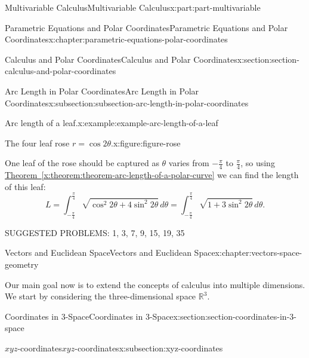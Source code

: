 \documentclass[twoside,10pt,]{book}
\newcommand{\xreffont}{\relax}
\numberwithin{equation}{part}
\newcommand{\RR}{\mathbb{R}}
\begin{document}
\begin{partptx}{Multivariable Calculus}{}{Multivariable Calculus}{}{}{x:part:part-multivariable}
\begin{chapterptx}{Parametric Equations and Polar Coordinates}{}{Parametric Equations and Polar Coordinates}{}{}{x:chapter:parametric-equations-polar-coordinates}
\begin{sectionptx}{Calculus and Polar Coordinates}{}{Calculus and Polar Coordinates}{}{}{x:section:section-calculus-and-polar-coordinates}
\begin{subsectionptx}{Arc Length in Polar Coordinates}{}{Arc Length in Polar Coordinates}{}{}{x:subsection:subsection-arc-length-in-polar-coordinates}
\begin{example}{Arc length of a leaf.}{x:example:example-arc-length-of-a-leaf}
\begin{figureptx}{The four leaf rose \(r=\cos2\theta\).}{x:figure:figure-rose}{}
\begin{image}{0}{1}{0}
{
}%
\end{image}%
\tcblower
\end{figureptx}%
One leaf of the rose should be captured as \(\theta\) varies from \(-\frac{\pi}{4}\) to \(\frac{\pi}{4}\), so using \hyperref[x:theorem:theorem-arc-length-of-a-polar-curve]{Theorem~{\xreffont\ref{x:theorem:theorem-arc-length-of-a-polar-curve}}} we can find the length of this leaf:%
%
\begin{equation*}
L = \int_{-\frac{\pi}{4}}^{\frac{\pi}{4}}\sqrt{\cos^{2}2\theta + 4\sin^{2}2\theta}\,d\theta = \int_{-\frac{\pi}{4}}^{\frac{\pi}{4}}\sqrt{1 + 3\sin^{2}2\theta}\,d\theta.
\end{equation*}
\end{example}
SUGGESTED PROBLEMS: 1, 3, 7, 9, 15, 19, 35%
\end{subsectionptx}
\end{sectionptx}
\end{chapterptx}
%
\typeout{************************************************}
\typeout{************************************************}
%
\begin{chapterptx}{Vectors and Euclidean Space}{}{Vectors and Euclidean Space}{}{}{x:chapter:vectors-space-geometry}
\begin{introduction}{}%
Our main goal now is to extend the concepts of calculus into multiple dimensions. We start by considering the three-dimensional space \(\RR^{3}\).%
\end{introduction}%
%
%
\typeout{************************************************}
\typeout{************************************************}
%
\begin{sectionptx}{Coordinates in 3-Space}{}{Coordinates in 3-Space}{}{}{x:section:section-coordinates-in-3-space}
%
%
\typeout{************************************************}
\typeout{************************************************}
%
\begin{subsectionptx}{\(xyz\)-coordinates}{}{\(xyz\)-coordinates}{}{}{x:subsection:xyz-coordinates}

\end{subsectionptx}
\end{sectionptx}
\end{chapterptx}
\end{partptx}
\end{document}
